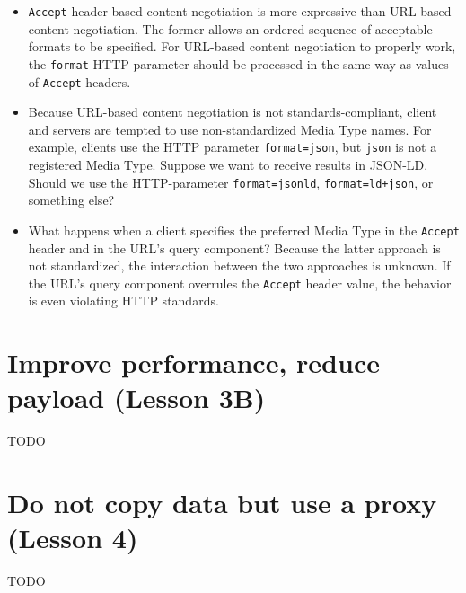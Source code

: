 \documentclass[a4paper]{scrartcl}
\newcommand{\textt}[1]{{\small \texttt{#1}}}
\begin{document}
\begin{itemize}

\item \textt{Accept} header-based content negotiation is more
  expressive than URL-based content negotiation.  The former allows an
  ordered sequence of acceptable formats to be specified.  For
  URL-based content negotiation to properly work, the \textt{format}
  HTTP parameter should be processed in the same way as values of
  \textt{Accept} headers.

\item Because URL-based content negotiation is not
  standards-compliant, client and servers are tempted to use
  non-standardized Media Type names.  For example, clients use the
  HTTP parameter \textt{format=json}, but \textt{json} is not a
  registered Media Type.  Suppose we want to receive results in
  JSON-LD.  Should we use the HTTP-parameter \textt{format=jsonld},
  \textt{format=ld+json}, or something else?

\item What happens when a client specifies the preferred Media Type in
  the \textt{Accept} header and in the URL's query component?  Because
  the latter approach is not standardized, the interaction between the
  two approaches is unknown.  If the URL's query component overrules
  the \textt{Accept} header value, the behavior is even violating HTTP
  standards.
  
\end{itemize}


\section{Improve performance, reduce payload (Lesson 3B)}

TODO


\section{Do not copy data but use a proxy (Lesson 4)}

TODO
\end{document}
